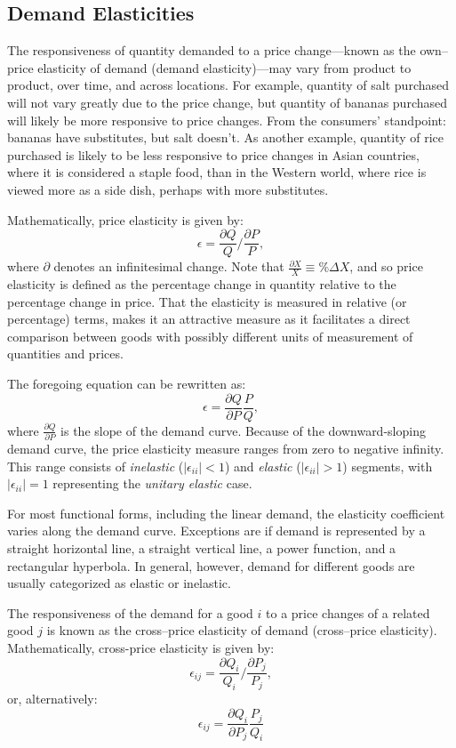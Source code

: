 \documentclass[
]{book}
\begin{document}
\hypertarget{demand-elasticities}{%
\subsection{Demand Elasticities}\label{demand-elasticities}}

The responsiveness of quantity demanded to a price change---known as the own--price elasticity of demand (demand elasticity)---may vary from product to product, over time, and across locations. For example, quantity of salt purchased will not vary greatly due to the price change, but quantity of bananas purchased will likely be more responsive to price changes. From the consumers' standpoint: bananas have substitutes, but salt doesn't. As another example, quantity of rice purchased is likely to be less responsive to price changes in Asian countries, where it is considered a staple food, than in the Western world, where rice is viewed more as a side dish, perhaps with more substitutes.

Mathematically, price elasticity is given by: \[\epsilon = \frac{\partial Q}{Q}/\frac{\partial P}{P},\] where \(\partial\) denotes an infinitesimal change. Note that \(\frac{\partial X}{X} \equiv \%\Delta X\), and so price elasticity is defined as the percentage change in quantity relative to the percentage change in price. That the elasticity is measured in relative (or percentage) terms, makes it an attractive measure as it facilitates a direct comparison between goods with possibly different units of measurement of quantities and prices.

The foregoing equation can be rewritten as: \[\epsilon = \frac{\partial Q}{\partial P}\frac{P}{Q},\] where \(\frac{\partial Q}{\partial P}\) is the slope of the demand curve. Because of the downward-sloping demand curve, the price elasticity measure ranges from zero to negative infinity. This range consists of \emph{inelastic} (\(|\epsilon_{ii}| < 1\)) and \emph{elastic} (\(|\epsilon_{ii}| > 1\)) segments, with \(|\epsilon_{ii}| = 1\) representing the \emph{unitary elastic} case.

For most functional forms, including the linear demand, the elasticity coefficient varies along the demand curve. Exceptions are if demand is represented by a straight horizontal line, a straight vertical line, a power function, and a rectangular hyperbola. In general, however, demand for different goods are usually categorized as elastic or inelastic.

The responsiveness of the demand for a good \(i\) to a price changes of a related good \(j\) is known as the cross--price elasticity of demand (cross--price elasticity). Mathematically, cross-price elasticity is given by: \[\epsilon_{ij} = \frac{\partial Q_i}{Q_i}/\frac{\partial P_j}{P_j},\] or, alternatively: \[\epsilon_{ij} = \frac{\partial Q_i}{\partial P_j}\frac{P_j}{Q_i}\]
\end{document}
